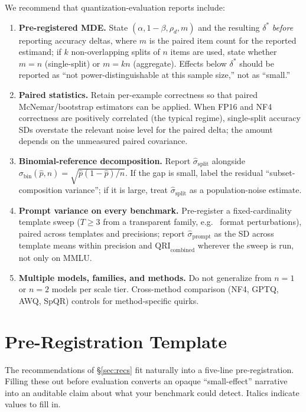 \documentclass{article}
\begin{document}
We recommend that quantization-evaluation reports include:
\begin{enumerate}
    \item \textbf{Pre-registered MDE.} State $(\alpha, 1-\beta, \rho_d, m)$ and the resulting $\delta^*$ \emph{before} reporting accuracy deltas, where $m$ is the paired item count for the reported estimand; if $k$ non-overlapping splits of $n$ items are used, state whether $m{=}n$ (single-split) or $m{=}kn$ (aggregate). Effects below $\delta^*$ should be reported as ``not power-distinguishable at this sample size,'' not as ``small.''
    \item \textbf{Paired statistics.} Retain per-example correctness so that paired McNemar/bootstrap estimators can be applied. When FP16 and NF4 correctness are positively correlated (the typical regime), single-split accuracy SDs overstate the relevant noise level for the paired delta; the amount depends on the unmeasured paired covariance.
    \item \textbf{Binomial-reference decomposition.} Report $\hat\sigma_{\text{split}}$ alongside $\sigma_{\text{bin}}(\hat p, n) = \sqrt{\hat p(1-\hat p)/n}$. If the gap is small, label the residual ``subset-composition variance''; if it is large, treat $\hat\sigma_{\text{split}}$ as a population-noise estimate.
    \item \textbf{Prompt variance on every benchmark.} Pre-register a fixed-cardinality template sweep ($T{\ge}3$ from a transparent family, e.g.\ \citet{sclar2024quantifying} format perturbations), paired across templates and precisions; report $\hat\sigma_{\text{prompt}}$ as the SD across template means within precision and $\mathrm{QRI}_{\text{combined}}$ wherever the sweep is run, not only on MMLU.
    \item \textbf{Multiple models, families, and methods.} Do not generalize from $n{=}1$ or $n{=}2$ models per scale tier. Cross-method comparison (NF4, GPTQ, AWQ, SpQR) controls for method-specific quirks.
\end{enumerate}

\section{Pre-Registration Template}
\label{sec:prereg}

The recommendations of §\ref{sec:recs} fit naturally into a five-line pre-registration. Filling these out before evaluation converts an opaque ``small-effect'' narrative into an auditable claim about what your benchmark could detect. Italics indicate values to fill in.
\end{document}
